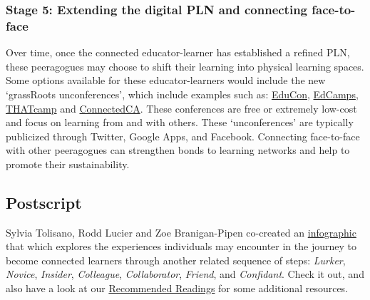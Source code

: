 \subsubsection{Stage 5: Extending the digital PLN and connecting
face-to-face}

Over time, once the connected educator-learner has established a refined
PLN, these peeragogues may choose to shift their learning into physical
learning spaces. Some options available for these educator-learners
would include the new `grassRoots unconferences', which include examples
such as: \href{http://educonphilly.org/}{EduCon},
\href{http://davidwees.com/content/what-edcamp}{EdCamps},
\href{http://thatcamp.org/}{THATcamp} and
\href{http://connectedcanada.org/}{ConnectedCA}. These conferences are
free or extremely low-cost and focus on learning from and with others.
These `unconferences' are typically publicized through Twitter, Google
Apps, and Facebook. Connecting face-to-face with other peeragogues can
strengthen bonds to learning networks and help to promote their
sustainability.

\subsection{Postscript}

Sylvia Tolisano, Rodd Lucier and Zoe Branigan-Pipen co-created an
\href{http://farm9.staticflickr.com/8160/7161689001\_9b6725a4ca\_h.jpg}{infographic}
that which explores the experiences individuals may encounter in the
journey to become connected learners through another related sequence of
steps: \emph{Lurker}, \emph{Novice}, \emph{Insider}, \emph{Colleague},
\emph{Collaborator}, \emph{Friend}, and \emph{Confidant}. Check it out,
and also have a look at our
\href{http://peeragogy.org/recommended-reading/}{Recommended Readings}
for some additional resources.
